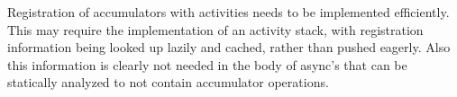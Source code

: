 
Registration of accumulators with activities needs to be implemented
efficiently. This may require the implementation of an activity stack,
with registration information being looked up lazily and cached,
rather than pushed eagerly.  Also this information is clearly not
needed in the  body of async's that can be statically analyzed to not
contain accumulator operations.

